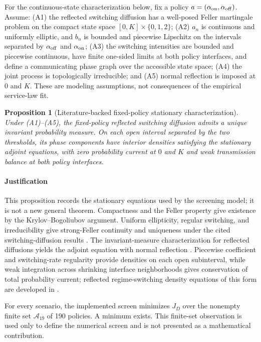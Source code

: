 \documentclass[preprint,12pt]{elsarticle}
\newtheorem{proposition}{Proposition}
\newcommand{\Aset}{\mathcal{A}}
\begin{document}
For the continuous-state characterization below, fix a policy
$a=(\alpha_{\rm on},\alpha_{\rm off})$. Assume: (A1) the reflected
switching diffusion has a well-posed Feller martingale problem on the compact
state space $[0,K]\times\{0,1,2\}$; (A2) $a_n$ is continuous and uniformly
elliptic, and $b_n$ is bounded and piecewise Lipschitz on the intervals
separated by $\alpha_{\rm off}$ and $\alpha_{\rm on}$; (A3) the switching
intensities are bounded and piecewise continuous, have finite one-sided limits
at both policy interfaces, and define a communicating phase graph over the
accessible state space; (A4) the joint process is topologically irreducible;
and (A5) normal reflection is imposed at $0$ and $K$. These are modeling
assumptions, not consequences of the empirical service-law fit.

\begin{proposition}[Literature-backed fixed-policy stationary characterization]
\label{prop:invariant}
Under (A1)--(A5), the fixed-policy reflected switching diffusion admits a
unique invariant probability measure. On each open interval separated by the
two thresholds, its phase components have interior densities satisfying the
stationary adjoint equations, with zero probability current at $0$ and $K$ and
weak transmission balance at both policy interfaces.
\end{proposition}

\paragraph{Justification}
This proposition records the stationary equations used by the screening model;
it is not a new general theorem. Compactness and the Feller property give
existence by the Krylov--Bogoliubov argument. Uniform ellipticity, regular
switching, and irreducibility give strong-Feller continuity and uniqueness
under the cited switching-diffusion results
\cite{yin2010hybrid,shao2018invariant}. The invariant-measure
characterization for reflected diffusions yields the adjoint equation with
normal reflection \cite{kang2014stationary}. Piecewise coefficient and
switching-rate regularity provide densities on each open subinterval, while
weak integration across shrinking interface neighborhoods gives conservation
of total probability current; reflected regime-switching density equations of
this form are developed in \cite{jang2008reflected}.

For every scenario, the implemented screen minimizes $J_D$ over the nonempty
finite set $\Aset_{19}$ of 190 policies. A minimum exists. This
finite-set observation is used only to define the numerical screen and is not
presented as a mathematical contribution.
\end{document}
